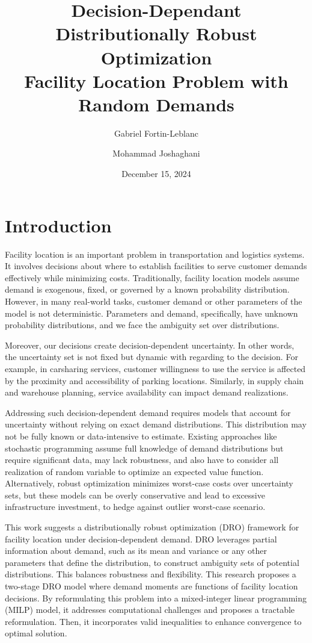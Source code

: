\documentclass[12pt, letterpaper]{article}
\title{
	Decision-Dependant Distributionally Robust Optimization \\
	\large Facility Location Problem with Random Demands
}
\author[1]{Gabriel Fortin-Leblanc}
\author[2]{Mohammad Joshaghani}
\affil[1]{Université de Montréal}
\affil[2]{Université du Québec à Montréal}
\date{December 15, 2024}
\begin{document}
	\maketitle
	\tableofcontents
	\newpage
	
	\section*{Introduction}
Facility location is an important problem in transportation and logistics systems. It involves decisions about where to establish facilities to serve customer demands effectively while minimizing costs. Traditionally, facility location models assume demand is exogenous, fixed, or governed by a known probability distribution. However, in many real-world tasks, customer demand or other parameters of the model is not deterministic. Parameters and demand, specifically, have unknown probability distributions, and we face the ambiguity set over distributions.

Moreover, our decisions create decision-dependent uncertainty. In other words, the uncertainty set is not fixed but dynamic with regarding to the decision. For example, in carsharing services, customer willingness to use the service is affected by the proximity and accessibility of parking locations. Similarly, in supply chain and warehouse planning, service availability can impact demand realizations.

Addressing such decision-dependent demand requires models that account for uncertainty without relying on exact demand distributions. This distribution may not be fully known or data-intensive to estimate. Existing approaches like stochastic programming assume full knowledge of demand distributions but require significant data, may lack robustness, and also have to consider all realization of random variable to optimize an expected value function. Alternatively, robust optimization minimizes worst-case costs over uncertainty sets, but these models can be overly conservative and lead to excessive infrastructure investment, to hedge against outlier worst-case scenario.

This work suggests a distributionally robust optimization (DRO) framework for facility location under decision-dependent demand. DRO leverages partial information about demand, such as its mean and variance or any other parameters that define the distribution, to construct ambiguity sets of potential distributions. This balances robustness and flexibility. This research proposes a two-stage DRO model where demand moments are functions of facility location decisions. By reformulating this problem into a mixed-integer linear programming (MILP) model, it addresses computational challenges and proposes a tractable reformulation. Then, it incorporates valid inequalities to enhance convergence to optimal solution.
\end{document}

